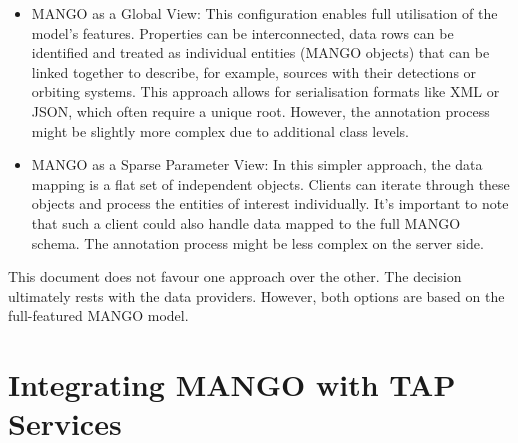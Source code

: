 \documentclass[11pt,a4paper]{ivoa}
\begin{document}
\begin{itemize}[noitemsep,topsep=0pt,parsep=0pt,partopsep=0pt]
    \item MANGO as a Global View: This configuration enables full utilisation of the 
          model's features. Properties can be interconnected, data rows can be identified
          and treated as individual entities (MANGO objects) that can be linked together to describe,
          for example, sources with their detections or orbiting systems.
          This approach allows for serialisation formats like XML or JSON, which often require
          a unique root.
          However, the annotation process might be slightly more complex due to additional class levels.
    \item MANGO as a Sparse Parameter View: In this simpler approach, the data mapping is a
          flat set of independent objects. Clients can iterate through these objects and process
          the entities of interest individually.
          It's important to note that such a client could also handle data mapped to the full MANGO schema.
          The annotation process might be less complex on the server side.
\end{itemize}

This document does not favour one approach over the other.
The decision ultimately rests with the data providers.
However, both options are based on the full-featured MANGO model.

%


\section{Integrating MANGO with TAP Services}


\pagebreak
\appendix

% 

% 

% 
\end{document}
